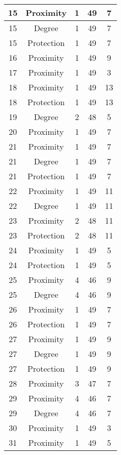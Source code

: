 \documentclass[results.tex]{subfiles}
\begin{document}
\begin{center}
\begin{tabular}{| c || c | c | c | c |}
    \hline
    15 & Proximity & 1 & 49 & 7 \\ 
    \hline
    15 & Degree & 1 & 49 & 7 \\ 
    \hline
    15 & Protection & 1 & 49 & 7 \\ 
    \hline
    16 & Proximity & 1 & 49 & 9 \\ 
    \hline
    17 & Proximity & 1 & 49 & 3 \\ 
    \hline
    18 & Proximity & 1 & 49 & 13 \\ 
    \hline
    18 & Protection & 1 & 49 & 13 \\ 
    \hline
    19 & Degree & 2 & 48 & 5 \\ 
    \hline
    20 & Proximity & 1 & 49 & 7 \\ 
    \hline
    21 & Proximity & 1 & 49 & 7 \\ 
    \hline
    21 & Degree & 1 & 49 & 7 \\ 
    \hline
    21 & Protection & 1 & 49 & 7 \\ 
    \hline
    22 & Proximity & 1 & 49 & 11 \\ 
    \hline
    22 & Degree & 1 & 49 & 11 \\ 
    \hline
    23 & Proximity & 2 & 48 & 11 \\ 
    \hline
    23 & Protection & 2 & 48 & 11 \\ 
    \hline
    24 & Proximity & 1 & 49 & 5 \\ 
    \hline
    24 & Protection & 1 & 49 & 5 \\ 
    \hline
    25 & Proximity & 4 & 46 & 9 \\ 
    \hline
    25 & Degree & 4 & 46 & 9 \\ 
    \hline
    26 & Proximity & 1 & 49 & 7 \\ 
    \hline
    26 & Protection & 1 & 49 & 7 \\ 
    \hline
    27 & Proximity & 1 & 49 & 9 \\ 
    \hline
    27 & Degree & 1 & 49 & 9 \\ 
    \hline
    27 & Protection & 1 & 49 & 9 \\ 
    \hline
    28 & Proximity & 3 & 47 & 7 \\ 
    \hline
    29 & Proximity & 4 & 46 & 7 \\ 
    \hline
    29 & Degree & 4 & 46 & 7 \\ 
    \hline
    30 & Proximity & 1 & 49 & 3 \\ 
    \hline
    31 & Proximity & 1 & 49 & 5 \\ 

\end{tabular}
\end{center}
\end{document}
